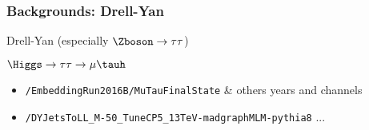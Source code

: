 \begin{frame}
\frametitle{Backgrounds: Drell-Yan}

\begin{minipage}[c]{.45\textwidth}
\begin{block}{Drell-Yan (especially $\Zboson\to\tau\tau$)\vphantom{ÀQj}}
\begin{center}
\end{center}
\end{block}
\end{minipage}
\hfill
\begin{minipage}[c]{.45\textwidth}
\begin{block}{$\Higgs\to\tau\tau\to\mu\tauh$\vphantom{ÀQj}}
\begin{center}
\end{center}
\end{block}
\end{minipage}

\begin{block}{}
\begin{itemize}
\item \texttt{/EmbeddingRun2016B/MuTauFinalState} \& others years and channels
\item \texttt{/DYJetsToLL\_M-50\_TuneCP5\_13TeV-madgraphMLM-pythia8} ...
\end{itemize}
\end{block}

%
%
%

\end{frame}